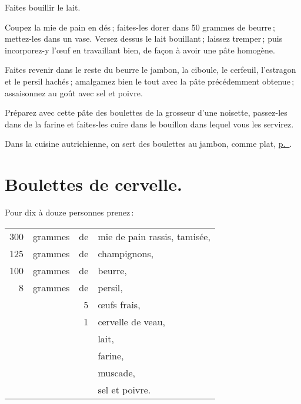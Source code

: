 Faites bouillir le lait.

Coupez la mie de pain en dés ; faites-les dorer dans 50 grammes de beurre ;
mettez-les dans un vase. Versez dessus le lait bouillant ; laissez tremper ;
puis incorporez-y l'œuf en travaillant bien, de façon à avoir une pâte
homogène.

Faites revenir dans le reste du beurre le jambon, la ciboule, le cerfeuil,
l’estragon et le persil hachés ; amalgamez bien le tout avec la pâte
précédemment obtenue ; assaisonnez au goût avec sel et poivre. 

Préparez avec cette pâte des boulettes de la grosseur d'une noisette,
passez-les dans de la farine et faites-les cuire dans le bouillon dans lequel
vous les servirez.

\sk

Dans la cuisine autrichienne, on sert des boulettes au jambon, comme plat,
\hyperlink{p0541}{p. \pageref{pg0541}}.

\section*{\centering Boulettes de cervelle.}

Pour dix à douze personnes prenez :

\medskip

\footnotesize
\begin{longtable}{rrrp{16em}}                                                    
    300 & grammes & de & mie de pain rassis, tamisée,                                                     \\
    125 & grammes & de & champignons,                                                                     \\
    100 & grammes & de & beurre,                                                                          \\
      8 & grammes & de & persil,                                                                          \\
        &         &  5 & œufs frais,                                                                      \\
        &         &  1 & cervelle de veau,                                                                \\
        &         &    & lait,                                                                            \\
        &         &    & farine,                                                                          \\
        &         &    & muscade,                                                                         \\
        &         &    & sel et poivre.                                                                   \\
\end{longtable}
\normalsize
                                          
